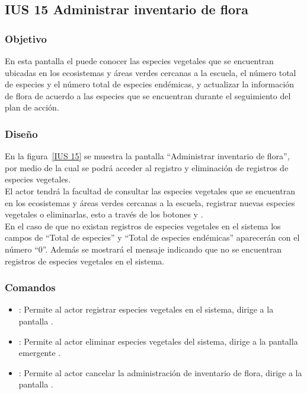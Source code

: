 \subsection{IUS 15 Administrar inventario de flora}

\subsubsection{Objetivo}
En esta pantalla el  puede conocer las especies vegetales que se encuentran ubicadas en los ecosistemas y áreas verdes cercanas a la escuela, el número total de especies y el número total de especies endémicas, y actualizar la información de flora de acuerdo a las especies que se encuentran durante el seguimiento del plan de acción.

\subsubsection{Diseño}

    En la figura~\ref{IUS 15} se muestra la pantalla ``Administrar inventario de flora'', por medio de la cual se podrá acceder al registro y eliminación de registros de especies vegetales.\\
    
    El actor tendrá la facultad de consultar las especies vegetales que se encuentran en los ecosistemas y áreas verdes cercanas a la escuela, registrar nuevas especies vegetales o eliminarlas, esto a través de los botones  y \botKo.\\
    
    En el caso de que no existan registros de especies vegetales en el sistema los campos de ``Total de especies'' y ``Total de especies endémicas'' aparecerán con el número ``0''. Además se mostrará el mensaje  indicando que no se encuentran registros de especies vegetales en el sistema.


\subsubsection{Comandos}
    \begin{itemize}
    \item {}: Permite al actor registrar especies vegetales en el sistema, dirige a la pantalla .
    
    \item \botKo[Eliminar]: Permite al actor eliminar especies vegetales del sistema, dirige a la pantalla emergente .
    
    \item {}: Permite al actor cancelar la administración de inventario de flora, dirige a la pantalla .
    \end{itemize}

